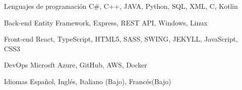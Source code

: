 

\begin{cvskills}
    \cvskill
    {Lenguajes de programación} %
    {C\#, C++, JAVA, Python, SQL,  XML, C, Kotlin} %

    \cvskill
    {Back-end} %
    {Entity Framework, Express, REST API, Windows, Linux} %


    \cvskill
    {Front-end} %
    {React, TypeScript, HTML5, SASS, SWING, JEKYLL, JavaScript, CSS3} %

    \cvskill
    {DevOps} %
    {Microsft Azure, GitHub, AWS, Docker} %

    \cvskill
    {Idiomas} %
    {Español, Inglés, Italiano (Bajo), Francés(Bajo) } %
    
   

\end{cvskills}
